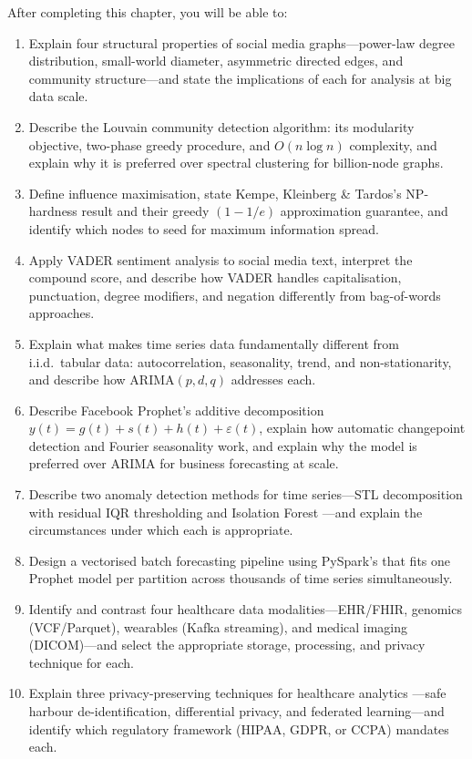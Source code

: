 \begin{chapterlearning}
After completing this chapter, you will be able to:
\begin{enumerate}
  \item Explain four structural properties of social media graphs---power-law
        degree distribution, small-world diameter, asymmetric directed
        edges, and community structure---and state the implications of each
        for analysis at big data scale.
  \item Describe the Louvain community detection algorithm: its modularity
        objective, two-phase greedy procedure, and $O(n \log n)$ complexity,
        and explain why it is preferred over spectral clustering for
        billion-node graphs.
  \item Define influence maximisation, state Kempe, Kleinberg \&
        Tardos's NP-hardness result and their greedy $(1-1/e)$
        approximation guarantee, and identify which nodes to seed for
        maximum information spread.
  \item Apply VADER sentiment analysis to social media text, interpret
        the compound score, and describe how VADER handles capitalisation,
        punctuation, degree modifiers, and negation differently from
        bag-of-words approaches.
  \item Explain what makes time series data fundamentally different from
        i.i.d.\ tabular data: autocorrelation, seasonality, trend, and
        non-stationarity, and describe how ARIMA$(p,d,q)$ addresses each.
  \item Describe Facebook Prophet's additive decomposition
        $y(t) = g(t) + s(t) + h(t) + \varepsilon(t)$, explain how
        automatic changepoint detection and Fourier seasonality work,
        and explain why the model is preferred over ARIMA for business
        forecasting at scale.
  \item Describe two anomaly detection methods for time series---STL
        decomposition with residual IQR thresholding and Isolation Forest
        ---and explain the circumstances under which each is appropriate.
  \item Design a vectorised batch forecasting pipeline using PySpark's
         that fits one Prophet model per partition
        across thousands of time series simultaneously.
  \item Identify and contrast four healthcare data modalities---EHR/FHIR,
        genomics (VCF/Parquet), wearables (Kafka streaming), and medical
        imaging (DICOM)---and select the appropriate storage, processing,
        and privacy technique for each.
  \item Explain three privacy-preserving techniques for healthcare analytics
        ---safe harbour de-identification, differential privacy, and
        federated learning---and identify which regulatory framework
        (HIPAA, GDPR, or CCPA) mandates each.
\end{enumerate}
\end{chapterlearning}

